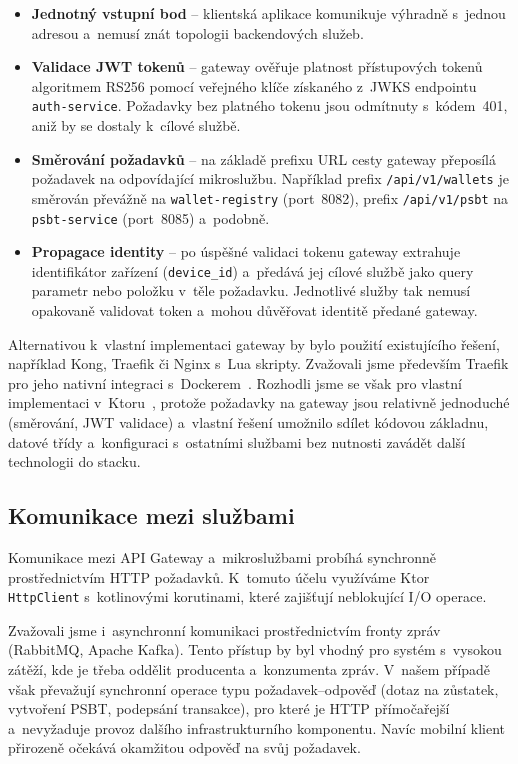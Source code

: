 \begin{itemize}
\item \textbf{Jednotný vstupní bod} -- klientská aplikace komunikuje výhradně
  s~jednou adresou a~nemusí znát topologii backendových služeb.
\item \textbf{Validace JWT tokenů} -- gateway ověřuje platnost přístupových
  tokenů algoritmem RS256 pomocí veřejného klíče získaného z~JWKS endpointu
  \texttt{auth-service}. Požadavky bez platného tokenu jsou odmítnuty
  s~kódem~401, aniž by se dostaly k~cílové službě.
\item \textbf{Směrování požadavků} -- na základě prefixu URL cesty gateway
  přeposílá požadavek na odpovídající mikroslužbu. Například prefix
  \texttt{/api/\allowbreak v1/\allowbreak wallets} je směrován převážně na
  \texttt{wallet-\allowbreak registry} (port~8082), prefix
  \texttt{/api/\allowbreak v1/\allowbreak psbt} na \texttt{psbt-\allowbreak service}
  (port~8085) a~podobně.
\item \textbf{Propagace identity} -- po úspěšné validaci tokenu gateway
  extrahuje identifikátor zařízení (\texttt{device\_id}) a~předává jej
  cílové službě jako query parametr nebo položku v~těle požadavku. Jednotlivé
  služby tak nemusí opakovaně validovat token a~mohou důvěřovat identitě
  předané gateway.
\end{itemize}

Alternativou k~vlastní implementaci gateway by bylo použití existujícího
řešení, například Kong, Traefik či Nginx s~Lua skripty. Zvažovali jsme
především Traefik pro jeho nativní integraci s~Dockerem~\cite{Docker}. Rozhodli jsme se
však pro vlastní implementaci v~Ktoru~\cite{KtorFramework}, protože požadavky na gateway jsou
relativně jednoduché (směrování, JWT validace) a~vlastní řešení umožnilo
sdílet kódovou základnu, datové třídy a~konfiguraci s~ostatními službami
bez nutnosti zavádět další technologii do stacku.

\subsection{Komunikace mezi službami}

Komunikace mezi API Gateway a~mikroslužbami probíhá synchronně prostřednictvím
HTTP požadavků. K~tomuto účelu využíváme Ktor~\cite{KtorFramework} \texttt{HttpClient} s~kotlinovými
korutinami, které zajišťují neblokující I/O operace.

Zvažovali jsme i~asynchronní komunikaci prostřednictvím fronty zpráv
(RabbitMQ, Apache Kafka). Tento přístup by byl vhodný pro systém s~vysokou
zátěží, kde je třeba oddělit producenta a~konzumenta zpráv. V~našem případě
však převažují synchronní operace typu požadavek--odpověď (dotaz na zůstatek,
vytvoření PSBT, podepsání transakce), pro které je HTTP přímočařejší
a~nevyžaduje provoz dalšího infrastrukturního komponentu. Navíc mobilní
klient přirozeně očekává okamžitou odpověď na svůj požadavek.

